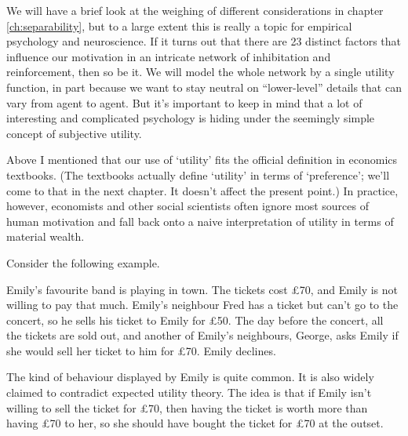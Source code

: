 We will have a brief look at the weighing of different considerations
in chapter \ref{ch:separability}, but to a large extent this is really
a topic for empirical psychology and neuroscience. If it turns out
that there are 23 distinct factors that influence our motivation in an
intricate network of inhibitation and reinforcement, then so be it. We
will model the whole network by a single utility function, in part
because we want to stay neutral on ``lower-level'' details that can
vary from agent to agent.  But it's important to keep in mind that a
lot of interesting and complicated psychology is hiding under the
seemingly simple concept of subjective utility.



Above I mentioned that our use of `utility' fits the official
definition in economics textbooks. (The textbooks actually define
`utility' in terms of `preference'; we'll come to that in the next
chapter. It doesn't affect the present point.) In practice, however,
economists and other social scientists often ignore most sources of
human motivation and fall back onto a naive interpretation of utility
in terms of material wealth.

Consider the following example.

\begin{example}
  Emily's favourite band is playing in town. The tickets cost £70, and
  Emily is not willing to pay that much. Emily's neighbour Fred has a
  ticket but can't go to the concert, so he sells his ticket to Emily
  for £50. The day before the concert, all the tickets are sold out,
  and another of Emily's neighbours, George, asks Emily if she would
  sell her ticket to him for £70. Emily declines.
\end{example}

The kind of behaviour displayed by Emily is quite common. It is also
widely claimed to contradict expected utility theory. The idea is that
if Emily isn't willing to sell the ticket for £70, then having the
ticket is worth more than having £70 to her, so she should have bought
the ticket for £70 at the outset.

